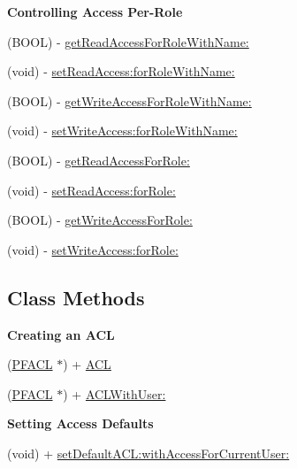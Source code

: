 \begin{Indent}{\bf Controlling Access Per-\/\+Role}\par
{\em 

 

 }\begin{DoxyCompactItemize}
\item 
(B\+O\+O\+L) -\/ \hyperlink{interface_p_f_a_c_l_a3d4c61fb9509294e55b1594d524b2ea0}{get\+Read\+Access\+For\+Role\+With\+Name\+:}
\item 
(void) -\/ \hyperlink{interface_p_f_a_c_l_afce7b83746fcc219f5a2234e92caaa54}{set\+Read\+Access\+:for\+Role\+With\+Name\+:}
\item 
(B\+O\+O\+L) -\/ \hyperlink{interface_p_f_a_c_l_a1a70132f12ee11f6448aa87dbeb343be}{get\+Write\+Access\+For\+Role\+With\+Name\+:}
\item 
(void) -\/ \hyperlink{interface_p_f_a_c_l_a51a2785e6cbb3ab0f701e3c9c6dbd52f}{set\+Write\+Access\+:for\+Role\+With\+Name\+:}
\item 
(B\+O\+O\+L) -\/ \hyperlink{interface_p_f_a_c_l_ad7ad4281e2732a41fc338260ff41f102}{get\+Read\+Access\+For\+Role\+:}
\item 
(void) -\/ \hyperlink{interface_p_f_a_c_l_a6e62c27f78da1ec247153f5cd699db70}{set\+Read\+Access\+:for\+Role\+:}
\item 
(B\+O\+O\+L) -\/ \hyperlink{interface_p_f_a_c_l_a3431e4aa71e5ae78e3b1e7bc891cab91}{get\+Write\+Access\+For\+Role\+:}
\item 
(void) -\/ \hyperlink{interface_p_f_a_c_l_a0a8573ce2356fa68e65de211a4ec96d4}{set\+Write\+Access\+:for\+Role\+:}
\end{DoxyCompactItemize}
\end{Indent}
\subsection*{Class Methods}
\begin{Indent}{\bf Creating an A\+C\+L}\par
{\em 

 

 }\begin{DoxyCompactItemize}
\item 
(\hyperlink{interface_p_f_a_c_l}{P\+F\+A\+C\+L} $\ast$) + \hyperlink{interface_p_f_a_c_l_a2782ec41d6f20bd8a1cbed100e6e8a69}{A\+C\+L}
\item 
(\hyperlink{interface_p_f_a_c_l}{P\+F\+A\+C\+L} $\ast$) + \hyperlink{interface_p_f_a_c_l_ad946cebbe69931e312e4ff90f7c42f56}{A\+C\+L\+With\+User\+:}
\end{DoxyCompactItemize}
\end{Indent}
\begin{Indent}{\bf Setting Access Defaults}\par
{\em 

 

 }\begin{DoxyCompactItemize}
\item 
(void) + \hyperlink{interface_p_f_a_c_l_a764018e1927127485223935fca5c73ea}{set\+Default\+A\+C\+L\+:with\+Access\+For\+Current\+User\+:}
\end{DoxyCompactItemize}
\end{Indent}



